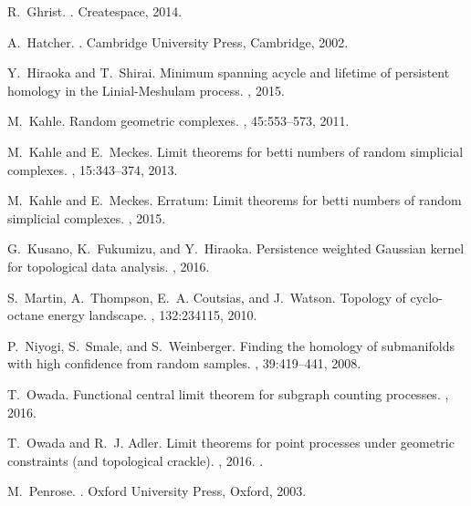 \documentclass[11pt]{amsart}
\numberwithin{equation}{section}
\theoremstyle{plain}
\theoremstyle{definition}
\begin{document}
\begin{thebibliography}{10}
R.~Ghrist.
.
\newblock Createspace, 2014.

A.~Hatcher.
.
\newblock Cambridge University Press, Cambridge, 2002.

Y.~Hiraoka and T.~Shirai.
\newblock Minimum spanning acycle and lifetime of persistent homology in the
  {L}inial-{M}eshulam process.
, 2015.

M.~Kahle.
\newblock Random geometric complexes.
, 45:553--573, 2011.

M.~Kahle and E.~Meckes.
\newblock Limit theorems for betti numbers of random simplicial complexes.
, 15:343--374, 2013.

M.~Kahle and E.~Meckes.
\newblock Erratum: Limit theorems for betti numbers of random simplicial
  complexes.
, 2015.

G.~Kusano, K.~Fukumizu, and Y.~Hiraoka.
\newblock Persistence weighted {G}aussian kernel for topological data analysis.
, 2016.

S.~Martin, A.~Thompson, E.~A. Coutsias, and J.~Watson.
\newblock Topology of cyclo-octane energy landscape.
, 132:234115, 2010.

P.~Niyogi, S.~Smale, and S.~Weinberger.
\newblock Finding the homology of submanifolds with high confidence from random
  samples.
, 39:419--441, 2008.

T.~Owada.
\newblock Functional central limit theorem for subgraph counting processes.
, 2016.

T.~Owada and R.~J. Adler.
\newblock Limit theorems for point processes under geometric constraints (and
  topological crackle).
, 2016.
.

M.~Penrose.
.
\newblock Oxford University Press, Oxford, 2003.


\end{thebibliography}
\end{document}
